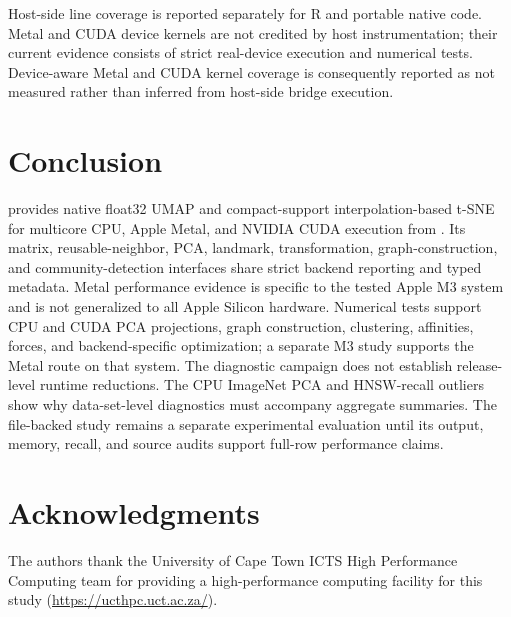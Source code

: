 \documentclass[article]{jss}
\newcommand{\fastEmbedR}{\pkg{fastEmbedR}\xspace}
\begin{document}
Host-side line coverage is reported separately for R and portable native
code. Metal and CUDA device kernels are not credited by host instrumentation;
their current evidence consists of strict real-device execution and numerical
tests. Device-aware Metal and CUDA kernel coverage is consequently reported as
not measured rather than inferred from host-side bridge execution.

\section{Conclusion}

\fastEmbedR provides native float32 UMAP and compact-support
interpolation-based t-SNE for
multicore CPU, Apple Metal, and NVIDIA CUDA execution from . Its
matrix, reusable-neighbor, PCA, landmark, transformation, graph-construction,
and community-detection interfaces share strict backend reporting and typed
metadata. Metal performance evidence is specific to the tested Apple M3
system and is not generalized to all Apple Silicon hardware. Numerical tests
support CPU and CUDA PCA projections, graph construction, clustering,
affinities, forces, and backend-specific optimization; a separate M3 study
supports the Metal route on that system. The diagnostic campaign does not
establish release-level runtime reductions. The CPU
ImageNet PCA and HNSW-recall outliers show why data-set-level diagnostics must
accompany aggregate summaries. The file-backed study remains a separate
experimental evaluation until its output, memory, recall, and source audits
support full-row performance claims.

\section*{Acknowledgments}

The authors thank the University of Cape Town ICTS High Performance Computing
team for providing a high-performance computing facility for this study
(\url{https://ucthpc.uct.ac.za/}).


\end{document}
